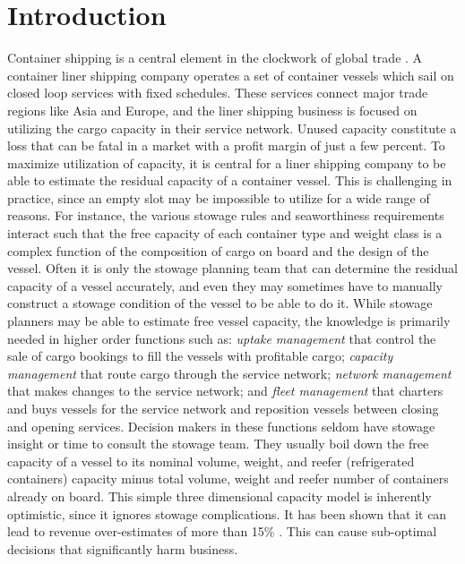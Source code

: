 \documentclass{llncs}
\begin{document}
\section{Introduction}
Container shipping is a central element in the clockwork of global trade \cite{EC13}. A container liner shipping company operates a set of container vessels which sail on closed loop services with fixed schedules. These services connect major trade regions like Asia and Europe, and the liner shipping business is focused on utilizing the cargo capacity in their service network. Unused capacity constitute a loss that can be fatal in a market with a profit margin of just a few percent.  
To maximize utilization of capacity, it is central for a liner shipping company to be able to estimate the residual capacity of a container vessel. This is challenging in practice, since an empty slot may be impossible to utilize for a wide range of reasons. 
For instance, the various stowage rules and seaworthiness requirements interact such that the free capacity of each container type and weight class is a complex function of the composition of cargo on board and the design of the vessel. Often it is only the stowage planning team that can determine the residual capacity of a vessel accurately, and even they may sometimes have to manually construct a stowage condition of the vessel to be able to do it. While stowage planners may be able to estimate free vessel capacity, the knowledge is primarily needed in higher order functions such as: {\em uptake management} that control the sale of cargo bookings to fill the vessels with profitable cargo; {\em capacity management} that route cargo through the service network; {\em network management} that makes changes to the service network; and {\em fleet management} that charters and buys vessels for the service network and reposition vessels between closing and opening services. Decision makers in these functions seldom have stowage insight or time to consult the stowage team. They usually boil down the free capacity of a vessel to its nominal volume, weight, and reefer (refrigerated containers) capacity minus total volume, weight and reefer number of containers already on board. This simple three dimensional capacity model is inherently optimistic, since it ignores stowage complications. It has been shown that it can lead to revenue over-estimates of more than 15\% \cite{AlbertosThesis}. This can cause sub-optimal decisions that significantly harm business.
\end{document}
